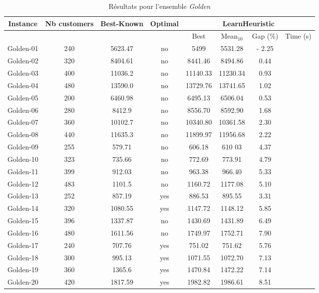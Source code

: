 \documentclass[a4paper,11pt]{article}%
\begin{document}
\begin{table}[h!]
\caption{Résultats pour l'ensemble \emph{Golden}}
\label{TG}
\begin{center}
\begin{tabular}{|@{}c@{}|@{}c@{}|@{}c@{}|@{}c@{}|@{}c@{}|@{}c@{}|@{}c@{}|@{}c@{}|}

\hline
 Instance & Nb customers & Best-Known & Optimal & \multicolumn{4}{c|}{LearnHeuristic}  \\
 \hline
 & & & & Best & Mean$_{10}$ & Gap (\%) & Time (s) \\ 
 \hline
 Golden-01 &240 & 5623.47 & no & 5499 & 5531.28 & - 2.25 &   \\
 \hline
 Golden-02 &320 & 8404.61 & no& 8441.46 & 8494.86 & 0.44 &    \\
  \hline
   Golden-03 &400 & 11036.2 & no& 11140.33 & 11230.34 & 0.93 &  \\
 \hline
   Golden-04 &480 &13590.0 & no& 13729.76 & 13741.65 & 1.02 &  \\
  \hline
   Golden-05 &200 & 6460.98 & no& 6495.13 & 6506.04 & 0.53 &  \\
 \hline
 Golden-06  &280 & 8412.9 &no & 8556.70 & 8592.90 & 1.68 &  \\
  \hline
  Golden-07 &360 & 10102.7 &no & 10340.80 & 10361.58 & 2.30 &  \\
 \hline
  Golden-08 &440 & 11635.3 &no & 11899.97 & 11956.68 & 2.22 &  \\
 \hline
 Golden-09 &255 & 579.71 &no & 606.18 & 610
 03 & 4.37 &  \\
 \hline
 Golden-10 &323 & 735.66 & no& 772.69 & 773.91 & 4.79 &  \\
 \hline
  Golden-11 &399 & 912.03 &no & 963.38 & 966.40 & 5.33 &   \\
  \hline
   Golden-12 &483 & 1101.5 &no & 1160.72 & 1177.08 & 5.10 &  \\
 \hline 
 Golden-13 &252 & 857.19 &yes & 886.53 & 895.55 & 3.31 & \\
  \hline
  Golden-14 &320 & 1080.55 &yes & 1147.72 & 1148.12 & 5.85 &  \\
  \hline
  Golden-15 &396 & 1337.87 & no& 1430.69 & 1431.89 & 6.49 &  \\
 \hline
   Golden-16 &480 & 1611.56 &no & 1749.97 & 1752.71 &7.90 &   \\
  \hline
  Golden-17 &240 & 707.76 & yes& 751.02 & 751.62 & 5.76 &   \\
  \hline
  Golden-18 &300 & 995.13 &yes & 1071.55 & 1072.70 & 7.13 &    \\
  \hline
  Golden-19 &360 & 1365.6 & yes& 1470.84 & 1472.22 & 7.14 & \\
 \hline 
   Golden-20 &420 & 1817.59 &yes & 1982.82 & 1986.61 & 8.51 &  \\
  \hline

\end{tabular}
\end{center}
\end{table}
\end{document}
